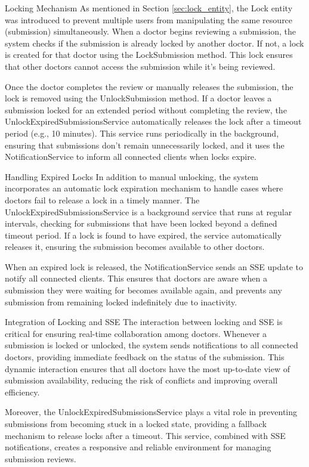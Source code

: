Locking Mechanism
As mentioned in Section \ref{sec:lock_entity}, the Lock entity was introduced to prevent multiple users from manipulating the same resource (submission) simultaneously. When a doctor begins reviewing a submission, the system checks if the submission is already locked by another doctor. If not, a lock is created for that doctor using the LockSubmission method. This lock ensures that other doctors cannot access the submission while it's being reviewed.

Once the doctor completes the review or manually releases the submission, the lock is removed using the UnlockSubmission method. If a doctor leaves a submission locked for an extended period without completing the review, the UnlockExpiredSubmissionsService automatically releases the lock after a timeout period (e.g., 10 minutes). This service runs periodically in the background, ensuring that submissions don’t remain unnecessarily locked, and it uses the NotificationService to inform all connected clients when locks expire.


Handling Expired Locks
In addition to manual unlocking, the system incorporates an automatic lock expiration mechanism to handle cases where doctors fail to release a lock in a timely manner. The UnlockExpiredSubmissionsService is a background service that runs at regular intervals, checking for submissions that have been locked beyond a defined timeout period. If a lock is found to have expired, the service automatically releases it, ensuring the submission becomes available to other doctors.

When an expired lock is released, the NotificationService sends an SSE update to notify all connected clients. This ensures that doctors are aware when a submission they were waiting for becomes available again, and prevents any submission from remaining locked indefinitely due to inactivity.

Integration of Locking and SSE
The interaction between locking and SSE is critical for ensuring real-time collaboration among doctors. Whenever a submission is locked or unlocked, the system sends notifications to all connected doctors, providing immediate feedback on the status of the submission. This dynamic interaction ensures that all doctors have the most up-to-date view of submission availability, reducing the risk of conflicts and improving overall efficiency.

Moreover, the UnlockExpiredSubmissionsService plays a vital role in preventing submissions from becoming stuck in a locked state, providing a fallback mechanism to release locks after a timeout. This service, combined with SSE notifications, creates a responsive and reliable environment for managing submission reviews.

